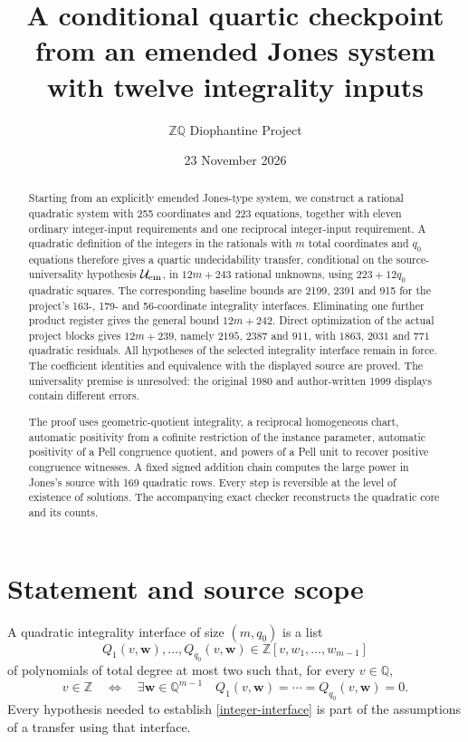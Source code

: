\documentclass[11pt]{article}
\title{A conditional quartic checkpoint from an emended Jones system\\with twelve integrality inputs}
\author{\(\mathbb Z\mathbb Q\) Diophantine Project}
\date{23 November 2026}
\newcommand{\Z}{\mathbb Z}
\newcommand{\Q}{\mathbb Q}
\begin{document}
\maketitle
\begin{abstract}
Starting from an explicitly emended Jones-type system, we construct
a rational quadratic system with 255 coordinates and 223 equations, together
with eleven ordinary integer-input requirements and one reciprocal
integer-input requirement. A quadratic definition of the integers in the
rationals with \(m\) total coordinates and \(q_0\) equations therefore gives
a quartic undecidability transfer, conditional on the source-universality
hypothesis $\mathcal U_{\rm em}$, in \(12m+243\) rational unknowns, using
\(223+12q_0\) quadratic squares. The corresponding baseline bounds are
2199, 2391 and 915 for the project's 163-, 179- and 56-coordinate
integrality interfaces. Eliminating one further product register gives the general bound
$12m+242$. Direct optimization of the actual project blocks gives
$12m+239$, namely $2195$, $2387$ and $911$, with $1863$, $2031$
and $771$ quadratic residuals. All hypotheses of the selected integrality
interface remain in force. The coefficient identities and equivalence with
the displayed source are proved. The universality premise is unresolved:
the original 1980 and author-written 1999 displays contain different errors.

The proof uses geometric-quotient integrality, a reciprocal homogeneous
chart, automatic positivity from a cofinite restriction of the instance
parameter, automatic positivity of a Pell congruence quotient, and powers
of a Pell unit to recover positive congruence witnesses. A fixed signed
addition chain computes the large power in Jones's source with 169
quadratic rows. Every step is reversible at the level of existence of
solutions. The accompanying exact checker reconstructs the quadratic core
and its counts.
\end{abstract}

\section{Statement and source scope}
A quadratic integrality interface of size \((m,q_0)\) is a list
\[
 Q_1(v,\mathbf w),\ldots,Q_{q_0}(v,\mathbf w)
 \in\Z[v,w_1,\ldots,w_{m-1}]
\]
of polynomials of total degree at most two such that, for every \(v\in\Q\),
\begin{equation}\label{integer-interface}
 v\in\Z\quad\Longleftrightarrow\quad
 \exists\mathbf w\in\Q^{m-1}\quad
 Q_1(v,\mathbf w)=\cdots=Q_{q_0}(v,\mathbf w)=0.
\end{equation}
Every hypothesis needed to establish \eqref{integer-interface} is part of
the assumptions of a transfer using that interface.
\end{document}

